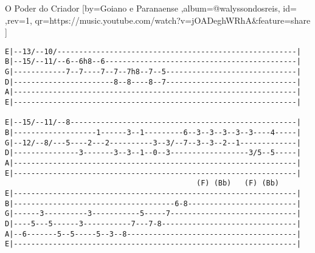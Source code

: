 \beginsong
{O Poder do Criador %
}[by={Goiano e Paranaense %
},album={@walyssondosreis},
id={ %
},rev={1}, %
qr={https://music.youtube.com/watch?v=jOADeghWRhA&feature=share %
}]
\lstset{basicstyle=\scriptsize\bf} %
\begin{lstlisting}
E|--13/--10/-------------------------------------------------------|
B|--15/--11/--6--6h8--6--------------------------------------------|
G|------------7--7----7--7--7h8--7--5------------------------------|
D|-----------------------8--8----8--7------------------------------|
A|-----------------------------------------------------------------|
E|-----------------------------------------------------------------|

E|--15/--11/--8----------------------------------------------------|
B|-------------------1------3--1---------6--3--3--3--3--3----4-----|
G|--12/--8/---5----2---2----------3--3/--7--3--3--2--1-------------|
D|---------------3-------3--3--1--0--3------------------3/5--5-----|
A|-----------------------------------------------------------------|
E|-----------------------------------------------------------------|
                                            (F) (Bb)   (F) (Bb)
E|-----------------------------------------------------------------|
B|-------------------------------------6-8-------------------------|
G|------3----------3-----------5-----7-----------------------------|
D|----5---5------3-----------7---7-8-------------------------------|
A|--6-------5--5-----5--3--8---------------------------------------|
E|-----------------------------------------------------------------|
\end{lstlisting}
